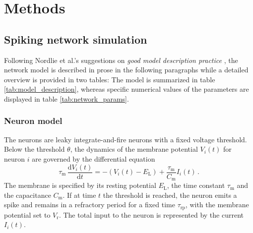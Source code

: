 \section{Methods}
\label{sec:methods}

\subsection{Spiking network simulation}
\label{sub:methods_simulation}
Following Nordlie et al.'s suggestions on 
\emph{good model description practice} \cite{nordlie2009},
the network model is described in prose in the following paragraphs while a detailed 
overview is provided in two tables: The model is summarized in table 
\ref{tab:model_description}, 
whereas specific numerical values of the parameters are displayed in table 
\ref{tab:network_params}. 

\subsubsection{Neuron model}
The neurons are leaky integrate-and-fire neurons with a fixed voltage threshold. 
Below the threshold $\theta$, the dynamics of the membrane potential $V_i(t)$ 
for neuron $i$ are governed by the differential equation 
\begin{equation}
    \tau_\text{m} \,\frac{\text{d} V_i(t)}{\text{d} t} 
            = -(V_i(t) - E_\text{L}) + \frac{\tau_\text{m}}{C_\text{m}} I_i(t) \, .
    \label{eq:leaky_integrator}
\end{equation}
The membrane is specified by its resting potential $E_\text{L}$, 
the time constant $\tau_\text{m}$ and the capacitance $C_\text{m}$.
If at time $t$ the threshold is reached, the neuron emits a spike and remains 
in a refractory period for a fixed time $\tau_\text{rp}$, with the membrane 
potential set to $V_\text{r}$. The total input to the neuron is represented by 
the current $I_i(t)$. 

